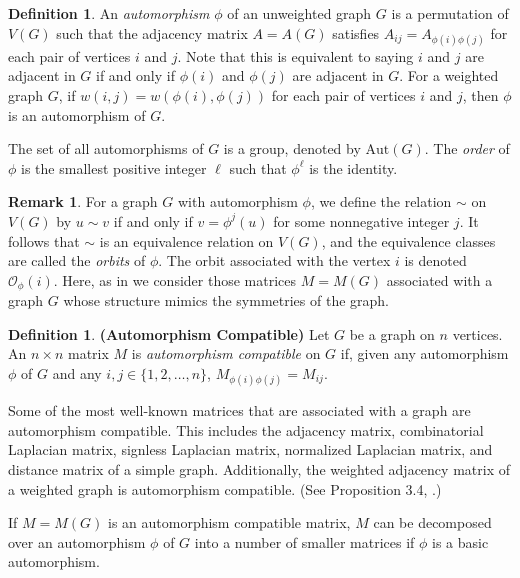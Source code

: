 \documentclass[preprint,12pt]{elsarticle}
\newcommand{\Aut}{\text{Aut}}
\renewcommand{\so}{\mathscr{O}}
\theoremstyle{definition}
\newtheorem{remark}[thm]{Remark}
\newtheorem{defn}[thm]{Definition}
\theoremstyle{remark}
\renewcommand{\emph}{\textit}
\begin{document}
\begin{defn}
An \emph{automorphism} $\phi$ of an unweighted graph $G$ is a permutation of $V(G)$ such that the adjacency matrix $A=A(G)$ satisfies $A_{ij} = A_{\phi(i) \phi(j)}$ for each pair of vertices $i$ and $j$. Note that  this is equivalent to saying
$i$ and $j$ are adjacent in $G$ if and only if $\phi(i)$ and $\phi(j)$ are adjacent in $G$. For a weighted graph $G$, if $w(i,j) = w(\phi(i), \phi(j))$ for each pair of vertices $i$ and $j$, then $\phi$ is an automorphism of $G$.

The set of all automorphisms of $G$ is a group, denoted by $\Aut(G)$. The \emph{order} of $\phi$ is the smallest positive integer $\ell$ such that $\phi^\ell$ is the identity.
\end{defn}

\begin{remark}\label{rem:orbits}
For a graph $G$ with automorphism $\phi$, we define the relation $\sim$ on $V(G)$ by $u \sim v$ if and only if $v = \phi^j(u)$ for some nonnegative integer $j$. It follows that $\sim$ is an equivalence relation on $V(G)$, and the equivalence classes are called the \emph{orbits} of $\phi$. The orbit associated with the vertex $i$ is denoted $\so_\phi(i)$. Here, as in \cite{BFW} we consider those matrices $M=M(G)$ associated with a graph $G$ whose structure mimics the symmetries of the graph.
\end{remark}

\begin{defn}\label{def:autocomp}\textbf{(Automorphism Compatible)}
Let $G$ be a graph on $n$ vertices. An $n \times n$ matrix $M$ is \emph{automorphism compatible} on $G$ if, given any automorphism $\phi$ of $G$ and any $i, j \in \{1, 2, \ldots, n\}$,
$M_{\phi(i) \phi(j)} = M_{i j}$.
\end{defn}

Some of the most well-known matrices that are associated with a graph are automorphism compatible. This includes the adjacency matrix, combinatorial Laplacian matrix, signless Laplacian matrix, normalized Laplacian matrix, and distance matrix of a simple graph. Additionally, the weighted adjacency matrix of a weighted graph is automorphism compatible. (See Proposition 3.4, \cite{BFW}.)

If $M=M(G)$ is an automorphism compatible matrix, $M$ can be decomposed over an automorphism $\phi$ of $G$ into a number of smaller matrices if $\phi$ is a basic automorphism.%
\end{document}

